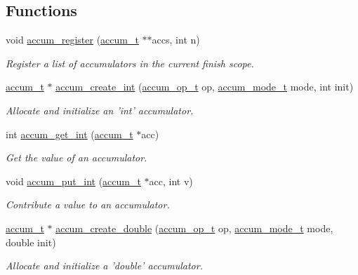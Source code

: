 \subsection*{Functions}
\begin{DoxyCompactItemize}
\item 
void \hyperlink{group__Accumulators_gae0a9e7d168bc808de67a91b5f23576fc}{accum\-\_\-register} (\hyperlink{structaccum__t}{accum\-\_\-t} $\ast$$\ast$accs, int n)
\begin{DoxyCompactList}\small\item\em Register a list of accumulators in the current finish scope. \end{DoxyCompactList}\item 
\hyperlink{structaccum__t}{accum\-\_\-t} $\ast$ \hyperlink{group__Accumulators_gab842e97fbe520feb181f32d0f0512146}{accum\-\_\-create\-\_\-int} (\hyperlink{group__Accumulators_ga3e4cb0c11f9af51019be26ec54dab3d5}{accum\-\_\-op\-\_\-t} op, \hyperlink{group__Accumulators_ga82b1a263886373f51b3b30c2e5c5d4c3}{accum\-\_\-mode\-\_\-t} mode, int init)
\begin{DoxyCompactList}\small\item\em Allocate and initialize an 'int' accumulator. \end{DoxyCompactList}\item 
int \hyperlink{group__Accumulators_gad7ab9402426ed9c8c9c6b193c31d4767}{accum\-\_\-get\-\_\-int} (\hyperlink{structaccum__t}{accum\-\_\-t} $\ast$acc)
\begin{DoxyCompactList}\small\item\em Get the value of an accumulator. \end{DoxyCompactList}\item 
void \hyperlink{group__Accumulators_ga580ca1c33da2bb58711b18fef57e8328}{accum\-\_\-put\-\_\-int} (\hyperlink{structaccum__t}{accum\-\_\-t} $\ast$acc, int v)
\begin{DoxyCompactList}\small\item\em Contribute a value to an accumulator. \end{DoxyCompactList}\item 
\hyperlink{structaccum__t}{accum\-\_\-t} $\ast$ \hyperlink{group__Accumulators_gabe52467178d0de700aa91de37c4cc9d2}{accum\-\_\-create\-\_\-double} (\hyperlink{group__Accumulators_ga3e4cb0c11f9af51019be26ec54dab3d5}{accum\-\_\-op\-\_\-t} op, \hyperlink{group__Accumulators_ga82b1a263886373f51b3b30c2e5c5d4c3}{accum\-\_\-mode\-\_\-t} mode, double init)
\begin{DoxyCompactList}\small\item\em Allocate and initialize a 'double' accumulator. \end{DoxyCompactList}\item 
$$
\end{DoxyCompactItemize}
